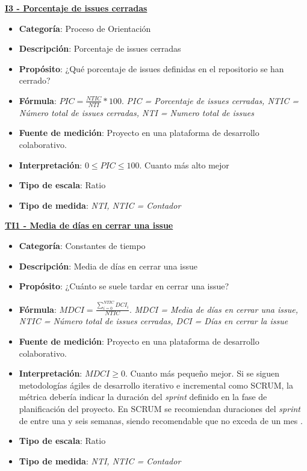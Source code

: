 \textbf{\underline{I3 - Porcentaje de issues cerradas}}

\begin{itemize}
	\item \textbf{Categoría}: Proceso de Orientación
	\item \textbf{Descripción}: Porcentaje de issues cerradas
	\item \textbf{Propósito}: ¿Qué porcentaje de issues definidas en el repositorio se han cerrado?
	\item \textbf{Fórmula}: $PIC = \frac{NTIC}{NTI}*100$. \textit{PIC = Porcentaje de issues cerradas, NTIC = Número total de issues cerradas, NTI = Numero total de issues}
	\item \textbf{Fuente de medición}: Proyecto en una plataforma de desarrollo colaborativo.
	\item \textbf{Interpretación}: $0 \leq PIC \leq 100$. Cuanto más alto mejor
	\item \textbf{Tipo de escala}: Ratio
	\item \textbf{Tipo de medida}: \textit{NTI, NTIC = Contador}
\end{itemize}

\textbf{\underline{TI1 - Media de días en cerrar una issue}}

\begin{itemize}
	\item \textbf{Categoría}: Constantes de tiempo
	\item \textbf{Descripción}:  Media de días en cerrar una issue
	\item \textbf{Propósito}: ¿Cuánto se suele tardar en cerrar una issue? 
	\item \textbf{Fórmula}: $MDCI = \frac{\sum_{i=0}^{NTIC}DCI_i}{NTIC}$. \textit{MDCI = Media de días en cerrar una issue, NTIC = Número total de issues cerradas, DCI = Días en cerrar la issue}
	\item \textbf{Fuente de medición}: Proyecto en una plataforma de desarrollo colaborativo.
	\item \textbf{Interpretación}: $MDCI \geq 0$. Cuanto más pequeño mejor. Si se siguen metodologías ágiles de desarrollo iterativo e incremental como SCRUM, la métrica debería indicar la duración del \textit{sprint} definido en la fase de planificación del proyecto. En SCRUM se recomiendan duraciones del \textit{sprint} de entre una y seis semanas, siendo recomendable que no exceda de un mes \citep{scrum_master_scrum_2019}.
	\item \textbf{Tipo de escala}: Ratio
	\item \textbf{Tipo de medida}: \textit{NTI, NTIC = Contador}
\end{itemize}

